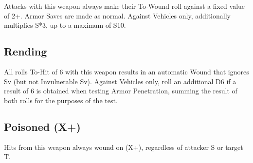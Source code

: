 Attacks with this weapon always make their To-Wound roll
against a fixed value of 2+. Armor Saves are made as normal.
Against Vehicles only, additionally multiplies S*3, up to a
maximum of S10.

\subsection{Rending}
All rolls To-Hit of 6 with this weapon results in an automatic
Wound that ignores Sv (but not Invulnerable Sv). Against
Vehicles only, roll an additional D6 if a result of 6 is obtained
when testing Armor Penetration, summing the result of both
rolls for the purposes of 
the test.
\subsection{Poisoned (X+)}
Hits from this weapon always wound on (X+), regardless of
attacker S or target T.